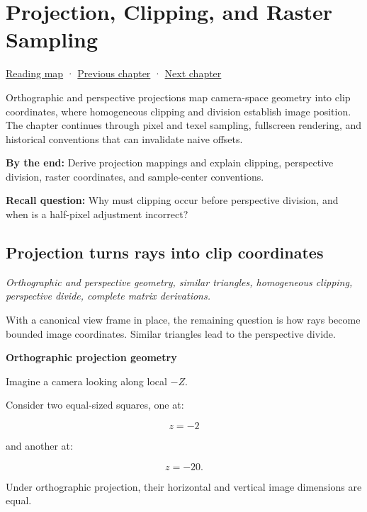 \chapter{Projection, Clipping, and Raster Sampling}\label{02-foundations-ii-ch033-projection-clipping-and-raster-sampling}\hypertarget{02-foundations-ii-ch033}{}\label{stagechapter:02-foundations-ii-ch033}

\hyperref[volume-reading-map]{Reading map} · \hyperref[02-foundations-ii-ch032-geometry-becomes-an-image-and-an-inverse-problem]{Previous chapter} · \hyperref[02-foundations-ii-ch034-robust-predicates-and-camera-sensitivity]{Next chapter}

Orthographic and perspective projections map camera-space geometry into clip coordinates, where homogeneous clipping and division establish image position. The chapter continues through pixel and texel sampling, fullscreen rendering, and historical conventions that can invalidate naive offsets.

\textbf{By the end:} Derive projection mappings and explain clipping, perspective division, raster coordinates, and sample-center conventions.

\textbf{Recall question:} Why must clipping occur before perspective division, and when is a half-pixel adjustment incorrect?

\section{Projection turns rays into clip coordinates}\label{02-foundations-ii-ch033-projection-turns-rays-into-clip-coordinates}

\emph{Orthographic and perspective geometry, similar triangles, homogeneous clipping, perspective divide, complete matrix derivations.}

With a canonical view frame in place, the remaining question is how rays become bounded image coordinates. Similar triangles lead to the perspective divide.

\textbf{Orthographic projection geometry}

Imagine a camera looking along local \(-Z\).

Consider two equal-sized squares, one at:

\[
 z=-2
\]

and another at:

\[
 z=-20.
\]

Under orthographic projection, their horizontal and vertical image dimensions are equal.

